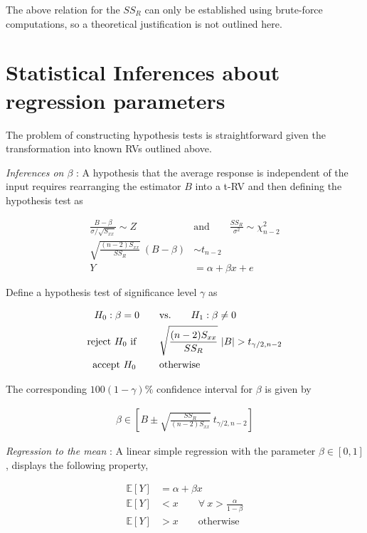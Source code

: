 The above relation for the $ SS_R $ can only be established using brute-force computations, so a theoretical justification is not outlined here.

\section{Statistical Inferences about regression parameters}

The problem of constructing hypothesis tests is straightforward given the transformation into known RVs outlined above.

\textit{Inferences on $ \beta $} : A hypothesis that the average response is independent of the input requires rearranging the estimator $ B $ into a t-RV and then defining the hypothesis test as

\begin{align}
	\frac{B - \beta}{\sigma/\sqrt{S_{xx}}} \sim Z \qquad &\text{and} \qquad \frac{SS_R}{\sigma^2} \sim \chi^2_{n-2} \nonumber \\
	\sqrt{\frac{(n-2) S_{xx}}{SS_R}}\ (B - \beta) &\sim t_{n-2} \\
	Y &= \alpha + \beta x + e \nonumber
\end{align}

Define a hypothesis test of significance level $ \gamma $ as

\begin{align}
	H_0 : \beta = 0 \qquad &\text{vs.} \qquad H_1 : \beta \neq 0 \nonumber \\
	\text{reject $ H_0 $ if } \qquad & \sqrt{\frac{(n-2) S_{xx}}{SS_R}}\ |B| > t_{\gamma/2, n-2} \nonumber \\
	\text{accept $ H_0 $  } \qquad & \text{otherwise}
\end{align}

The corresponding $ 100(1-\gamma)\% $ confidence interval for $ \beta $ is given by

\begin{align}
	\beta \in \left[B \pm \sqrt{{\frac{SS_R}{(n-2) S_{xx}}}}\ t_{\gamma/2, n-2}  \right]
\end{align}

\textit{Regression to the mean} : A linear simple regression with the parameter $ \beta \in [0, 1] $, displays the following property,

\begin{align}
	\mathbb{E}[Y] &= \alpha + \beta x \qquad \nonumber \\
	\mathbb{E}[Y] &< x \qquad \forall\ x > \frac{\alpha}{1 - \beta} \nonumber \\
	\mathbb{E}[Y] &> x \qquad \text{otherwise}
\end{align}

